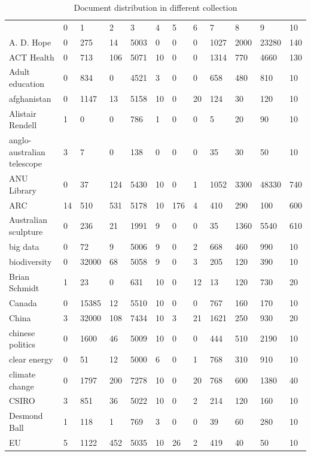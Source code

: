 \begin{table}
\label{table:doc_stat}
\caption{Document distribution in different collection}
\begin{tabular*}{0.5\textwidth}{|p{4cm}|l|l|l|l|l|l|l|l|l|l|l|}
\cline{1-12}
	& 0 & 1 & 2 & 3 & 4 & 5 & 6 & 7 & 8 & 9 & 10 \\\cline{1-12}
A. D. Hope &0 &275 &14 &5003 &0 &0 &0 &1027 &2000 &23280 &140\\
\cline{1-12}
ACT Health &0 &713 &106 &5071 &10 &0 &0 &1314 &770 &4660 &130\\
\cline{1-12}
Adult education &0 &834 &0 &4521 &3 &0 &0 &658 &480 &810 &10\\
\cline{1-12}
afghanistan &0 &1147 &13 &5158 &10 &0 &20 &124 &30 &120 &10\\
\cline{1-12}
Alistair Rendell &1 &0 &0 &786 &1 &0 &0 &5 &20 &90 &10\\
\cline{1-12}
anglo-australian telescope &3 &7 &0 &138 &0 &0 &0 &35 &30 &50 &10\\
\cline{1-12}
ANU Library &0 &37 &124 &5430 &10 &0 &1 &1052 &3300 &48330 &740\\
\cline{1-12}
ARC &14 &510 &531 &5178 &10 &176 &4 &410 &290 &100 &600\\
\cline{1-12}
Australian sculpture &0 &236 &21 &1991 &9 &0 &0 &35 &1360 &5540 &610\\
\cline{1-12}
big data &0 &72 &9 &5006 &9 &0 &2 &668 &460 &990 &10\\
\cline{1-12}
biodiversity &0 &32000 &68 &5058 &9 &0 &3 &205 &120 &390 &10\\
\cline{1-12}
Brian Schmidt &1 &23 &0 &631 &10 &0 &12 &13 &120 &730 &20\\
\cline{1-12}
Canada &0 &15385 &12 &5510 &10 &0 &0 &767 &160 &170 &10\\
\cline{1-12}
China &3 &32000 &108 &7434 &10 &3 &21 &1621 &250 &930 &20\\
\cline{1-12}
chinese politics &0 &1600 &46 &5009 &10 &0 &0 &444 &510 &2190 &10\\
\cline{1-12}
clear energy &0 &51 &12 &5000 &6 &0 &1 &768 &310 &910 &10\\
\cline{1-12}
climate change &0 &1797 &200 &7278 &10 &0 &20 &768 &600 &1380 &40\\
\cline{1-12}
CSIRO &3 &851 &36 &5022 &10 &0 &2 &214 &120 &160 &10\\
\cline{1-12}
Desmond Ball &1 &118 &1 &769 &3 &0 &0 &39 &60 &280 &10\\
\cline{1-12}
EU &5 &1122 &452 &5035 &10 &26 &2 &419 &40 &50 &10\\

\end{tabular*}
\end{table}
